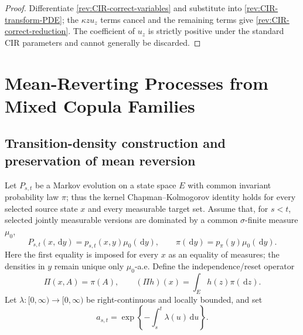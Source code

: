 \documentclass[11pt]{article}
\theoremstyle{remark}
\newcommand{\dd}{\,\mathrm d}
\begin{document}
\begin{proof}
Differentiate \eqref{rev:CIR-correct-variables} and substitute into
\eqref{rev:CIR-transform-PDE}; the $\kappa z u_z$ terms cancel and the remaining
terms give \eqref{rev:CIR-correct-reduction}.  The coefficient of $u_z$ is
strictly positive under the standard CIR parameters and cannot generally be
discarded.
\end{proof}

\section{Mean-Reverting Processes from Mixed Copula Families}
\label{sec:mixed-copula-processes}

\subsection{Transition-density construction and preservation of mean reversion}

Let $P_{s,t}$ be a Markov evolution on a state space $E$ with common invariant
probability law $\pi$; thus the kernel Chapman--Kolmogorov identity holds for
every selected source state $x$ and every measurable target set.  Assume that,
for $s<t$, selected jointly measurable versions are dominated by a common
$\sigma$-finite measure $\mu_0$,
\[
P_{s,t}(x,\dd y)=p_{s,t}(x,y)\mu_0(\dd y),
\qquad \pi(\dd y)=p_\pi(y)\mu_0(\dd y).
\]
Here the first equality is imposed for every $x$ as an equality of measures;
the densities in $y$ remain unique only $\mu_0$-a.e.
Define the independence/reset operator
\begin{equation}
\Pi(x,A)=\pi(A),\qquad (\Pi h)(x)=\int_Eh(z)\pi(\dd z).
\label{rev:reset-kernel}
\end{equation}
Let $\lambda:[0,\infty)\to[0,\infty)$ be right-continuous and locally bounded,
and set
\begin{equation}
a_{s,t}=\exp\!\left\{-\int_s^t\lambda(u)\dd u\right\}.
\label{rev:survival-weight}
\end{equation}
\end{document}

